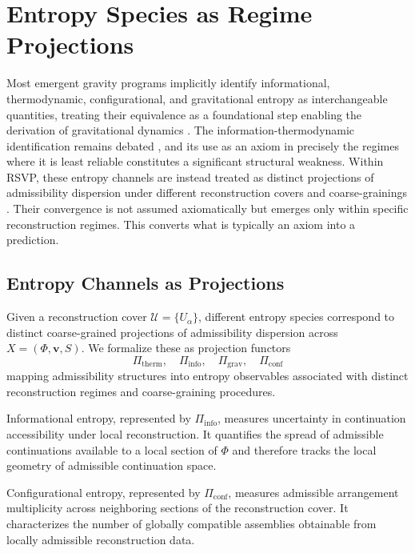 \documentclass[11pt, a4paper]{article}
\theoremstyle{plain}
\theoremstyle{definition}
\theoremstyle{remark}
\newcommand{\cover}{\{U_\alpha\}}
\newcommand{\Ucover}{\mathcal{U}}
\begin{document}
\section{Entropy Species as Regime Projections}
\label{sec:entropy}

Most emergent gravity programs implicitly identify informational, thermodynamic,
configurational, and gravitational entropy as interchangeable quantities, treating
their equivalence as a foundational step enabling the derivation of gravitational
dynamics \cite{verlinde2011,kastner2024}. The information-thermodynamic
identification remains debated \cite{jaynes1957}, and its use as an axiom in
precisely the regimes where it is least reliable constitutes a significant structural
weakness. Within RSVP, these entropy channels are instead treated as distinct
projections of admissibility dispersion under different reconstruction covers and
coarse-grainings \cite{amari2016}. Their convergence is not assumed axiomatically
but emerges only within specific reconstruction regimes. This converts what is
typically an axiom into a prediction.

\subsection{Entropy Channels as Projections}

Given a reconstruction cover $\Ucover = \cover$, different entropy species correspond
to distinct coarse-grained projections of admissibility dispersion across
$X = (\Phi, \mathbf{v}, S)$.  We formalize these as projection functors
\[
  \Pi_{\mathrm{therm}},\quad
  \Pi_{\mathrm{info}},\quad
  \Pi_{\mathrm{grav}},\quad
  \Pi_{\mathrm{conf}}
\]
mapping admissibility structures into entropy observables associated with distinct
reconstruction regimes and coarse-graining procedures.

Informational entropy, represented by $\Pi_{\mathrm{info}}$, measures uncertainty in
continuation accessibility under local reconstruction.  It quantifies the spread of
admissible continuations available to a local section of $\Phi$ and therefore tracks
the local geometry of admissible continuation space.

Configurational entropy, represented by $\Pi_{\mathrm{conf}}$, measures admissible
arrangement multiplicity across neighboring sections of the reconstruction cover.
It characterizes the number of globally compatible assemblies obtainable from locally
admissible reconstruction data.
\end{document}
